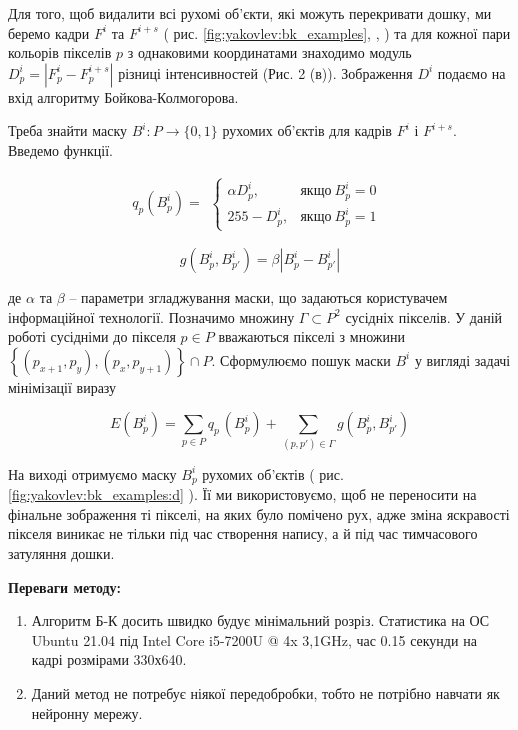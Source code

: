 Для того, щоб видалити всі рухомі об'єкти, які можуть перекривати дошку, ми
беремо кадри \(F^{i}\) та \(F^{i + s}\)  ( рис. \ref{fig:yakovlev:bk_examples},
,
) та для
кожної пари кольорів пікселів \(p\) з однаковими координатами знаходимо
модуль \(D_{p}^{i} = \left| F_{p}^{i} - F_{p}^{i + s} \right|\) різниці
інтенсивностей (Рис. 2 (в)). Зображення \(D^{i}\) подаємо на вхід
алгоритму Бойкова-Колмогорова.

Треба знайти маску $B^{i}:P \rightarrow \{0,1\}$ рухомих
об'єктів для кадрів \(F^{i}\) і \(F^{i + s}\).
Введемо функції.

\begin{equation}
    q_{p}(B_{p}^{i}) =
    \begin{gathered}
        \begin{cases}
            \alpha D_{p}^{i}, & якщо\ B_{p}^{i} = 0 \\
            255 - D_{p}^{i},  & якщо\ B_{p}^{i} = 1
        \end{cases}
    \end{gathered}
\end{equation}

\begin{equation}
    g(B_{p}^{i},B_{p'}^{i}) = \beta|B_{p}^{i} - B_{p'}^{i}|
\end{equation}

де \(\alpha\) та \(\beta\) -- параметри згладжування маски, що задаються
користувачем інформаційної технології. Позначимо множину
$\Gamma \subset P^{2}$ сусідніх пікселів. У даній роботі сусідніми до
пікселя \(p \in P\) вважаються пікселі з множини
\(\left\{ \left( p_{x + 1},p_{y} \right),\left( p_{x},p_{y + 1} \right) \right\} \cap P\).
Сформулюємо пошук маски \(B^{i}\) у вигляді задачі мінімізації виразу

\begin{equation}
    E\left( B_{p}^{i} \right) = \sum_{p \in P}^{}{q_{{p\ }}( B_{p}^{i}) +}\sum_{(p,p') \in \Gamma}^{}g(B_{p}^{i},B_{p'}^{i})
\end{equation}


На виході отримуємо маску \(B_{p}^{i}\) рухомих об'єктів ( рис.
\ref{fig:yakovlev:bk_examples:d} ).
Її ми використовуємо, щоб не переносити на фінальне зображення ті
пікселі, на яких було помічено рух, адже зміна яскравості пікселя
виникає не тільки під час створення напису, а й під час тимчасового
затуляння дошки.

\textbf{Переваги методу:}
\begin{enumerate}
    \item Алгоритм Б-К досить швидко будує мінімальний розріз. Статистика на ОС
          Ubuntu 21.04 під Intel Core i5-7200U @ 4x 3,1GHz, час 0.15 секунди на
          кадрі розмірами 330х640.
    \item Даний метод не потребує ніякої передобробки, тобто не потрібно навчати
          як нейронну мережу.
\end{enumerate}


